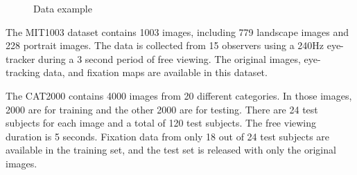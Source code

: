 \documentclass[12pt]{article}
\begin{document}
\begin{figure}[!h]
    \centering
    \hspace{1mm}
    \hspace{1mm}
    \caption{Data example}
    \label{img:data_example_2}
\end{figure}

The MIT1003 dataset contains 1003 images, including 779 landscape images and 228 portrait images.
The data is collected from 15 observers using a 240Hz eye-tracker during a 3 second period of free viewing. The original images, eye-tracking data, and fixation maps are available in this dataset.

The CAT2000 contains 4000 images from 20 different categories. In those images, 2000 are for training and the other 2000
are for testing. There are 24 test subjects for each image and a total of 120 test subjects. The free viewing duration is 5 seconds. Fixation data from only 18 out of 24 test subjects are available in the training
set, and the test set is released with only the original images.
\end{document}
